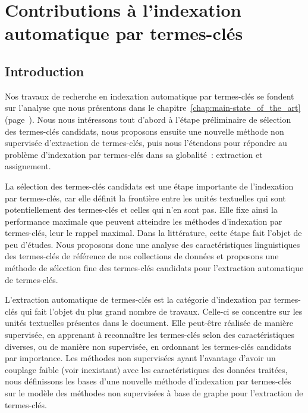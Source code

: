 \chapter{Contributions à l'indexation automatique par termes-clés}
\label{chap:main-automatic_keyphrase_annotation}

  \section{Introduction}
  \label{sec:main-automatic_keyphrase_annotation-introduction}
    Nos travaux de recherche en indexation automatique par termes-clés se
    fondent sur l'analyse que nous présentons dans le
    chapitre~\ref{chap:main-state_of_the_art}
    (page~\pageref{chap:main-state_of_the_art}). Nous nous intéressons tout
    d'abord à l'étape préliminaire de sélection des termes-clés candidats, nous
    proposons ensuite une nouvelle méthode non supervisée d'extraction de
    termes-clés, puis nous l'étendons pour répondre au problème d'indexation par
    termes-clés dans sa globalité~: extraction et assignement.

    La sélection des termes-clés candidats est une étape importante de
    l'indexation par termes-clés, car elle définit la frontière entre les unités
    textuelles qui sont potentiellement des termes-clés et celles qui n'en sont
    pas. Elle fixe ainsi la performance maximale que peuvent atteindre les
    méthodes d'indexation par termes-clés, leur le rappel maximal. Dans la
    littérature, cette étape fait l'objet de peu d'études. Nous proposons donc
    une analyse des caractéristiques linguistiques des termes-clés de référence
    de nos collections de données et proposons une méthode de sélection fine des
    termes-clés candidats pour l'extraction automatique de termes-clés.

    L'extraction automatique de termes-clés est la catégorie d'indexation par
    termes-clés qui fait l'objet du plus grand nombre de travaux. Celle-ci se
    concentre sur les unités textuelles présentes dans le document. Elle
    peut-être réalisée de manière supervisée, en apprenant à reconnaître les
    termes-clés selon des caractéristiques diverses, ou de manière non
    supervisée, en ordonnant les termes-clés candidats par importance. Les
    méthodes non supervisées ayant l'avantage d'avoir un couplage faible (voir
    inexistant) avec les caractéristiques des données traitées, nous définissons
    les bases d'une nouvelle méthode d'indexation par termes-clés sur le modèle
    des méthodes non supervisées à base de graphe pour l'extraction de
    termes-clés.

